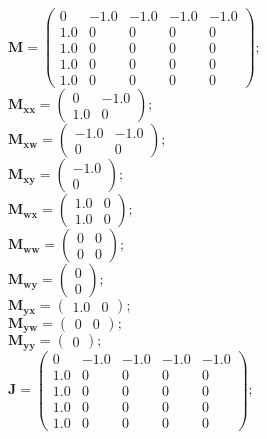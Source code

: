 \documentclass[11pt, oneside]{article}      %
\begin{document}
%
$ \mathbf{M} = \left(\begin{array}{ccccc}0 & -1.0 & -1.0 & -1.0 & -1.0\\1.0 & 0 & 0 & 0 & 0\\1.0 & 0 & 0 & 0 & 0\\1.0 & 0 & 0 & 0 & 0\\1.0 & 0 & 0 & 0 & 0\end{array}\right) ; $ 
%
\\
%
$ \mathbf{M_{xx}} = \left(\begin{array}{cc}0 & -1.0\\1.0 & 0\end{array}\right) ; $ 
%
\\
%
$ \mathbf{M_{xw}} = \left(\begin{array}{cc}-1.0 & -1.0\\0 & 0\end{array}\right) ; $ 
%
\\
%
$ \mathbf{M_{xy}} = \left(\begin{array}{c}-1.0\\0\end{array}\right) ; $ 
%
\\
%
$ \mathbf{M_{wx}} = \left(\begin{array}{cc}1.0 & 0\\1.0 & 0\end{array}\right) ; $ 
%
\\
%
$ \mathbf{M_{ww}} = \left(\begin{array}{cc}0 & 0\\0 & 0\end{array}\right) ; $ 
%
\\
%
$ \mathbf{M_{wy}} = \left(\begin{array}{c}0\\0\end{array}\right) ; $ 
%
\\
%
$ \mathbf{M_{yx}} = \left(\begin{array}{cc}1.0 & 0\end{array}\right) ; $ 
%
\\
%
$ \mathbf{M_{yw}} = \left(\begin{array}{cc}0 & 0\end{array}\right) ; $ 
%
\\
%
$ \mathbf{M_{yy}} = \left(\begin{array}{c}0\end{array}\right) ; $ 
%
\\
%
$ \mathbf{J} = \left(\begin{array}{ccccc}0 & -1.0 & -1.0 & -1.0 & -1.0\\1.0 & 0 & 0 & 0 & 0\\1.0 & 0 & 0 & 0 & 0\\1.0 & 0 & 0 & 0 & 0\\1.0 & 0 & 0 & 0 & 0\end{array}\right) ; $ 
\end{document}
